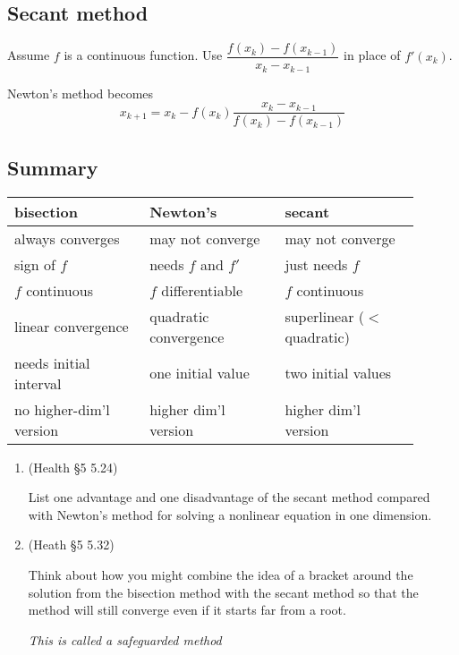 \documentclass[12pt,letterpaper,noanswers]{exam}
\begin{document}
\subsection*{Secant method}
\begin{tcolorbox}
Assume $f$ is a continuous function.  Use $\dfrac{f(x_k)-f(x_{k-1})}{x_k-x_{k-1}}$ in place of $f'(x_{k})$.  

Newton's method becomes \[x_{k+1} = x_k - f(x_k)\dfrac{x_k-x_{k-1}}{f(x_k) - f(x_{k-1})}\]
\end{tcolorbox}

\subsection*{Summary}
\begin{tabular}{p{0.3\linewidth} p{0.3\linewidth} p{0.3\linewidth}}
bisection & Newton's & secant \\
\hline
always converges & may not converge & may not converge\\
sign of $f$  & needs $f$ and $f'$ & just needs $f$ \\
$f$ continuous & $f$ differentiable & $f$ continuous\\
linear convergence & quadratic convergence & superlinear ($<$ quadratic) \\
needs initial interval & one initial value& two initial values\\
no higher-dim'l version & higher dim'l version & higher dim'l version \\
\end{tabular}

\begin{enumerate}[resume=classQ]
\item (Health \S5 5.24)

List one advantage and one disadvantage of the secant method compared with Newton's method for solving a nonlinear equation in one dimension.
\vspace{0.5in}

\item (Heath \S5 5.32) 

Think about how you might combine the idea of  a bracket around the solution from the bisection method with the secant method so that the method will still converge even if it starts far from a root.

\emph{This is called a safeguarded method}
\vspace{1in}

\end{enumerate}
\end{document}
